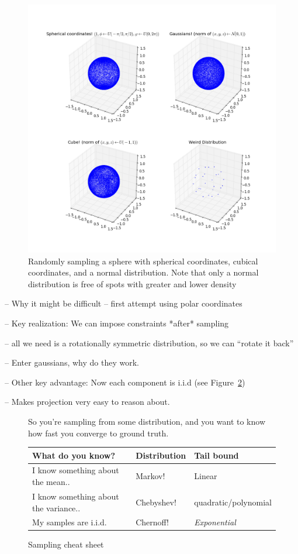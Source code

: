 \documentclass[11pt]{article}
\begin{document}
\begin{figure}
  \begin{center}
    \includegraphics[width=0.9\linewidth]{spheres.png}
  \end{center}

  \caption{Randomly sampling a sphere with spherical coordinates, cubical
    coordinates, and a normal distribution. Note that only a normal distribution
    is free of spots with greater and lower density}
  \label{fig:spheres}
\end{figure}

-- Why it might be difficult
-- first attempt using polar coordinates

-- Key realization: We can impose constraints *after* sampling

   -- all we need is a rotationally symmetric distribution, so we can ``rotate
   it back''

-- Enter gaussians, why do they work.

-- Other key advantage: Now each component is i.i.d (see Figure~\ref{fig:bounds})

    -- Makes projection very easy to reason about.

    \begin{figure}[H]
      So you're sampling from some distribution, and you want to know how fast
      you converge to ground truth.

      \begin{tabular}{lll}
        What do you know? & Distribution & Tail bound\\
        \hline
        I know something about the mean..  & Markov! & Linear \\
        I know something about the variance..  & Chebyshev! & quadratic/polynomial\\
        My samples are i.i.d.  & Chernoff! & \emph{Exponential}\\
        \hline
      \end{tabular}
      \caption{Sampling cheat sheet}
      \label{fig:bounds}
    \end{figure}
\end{document}
